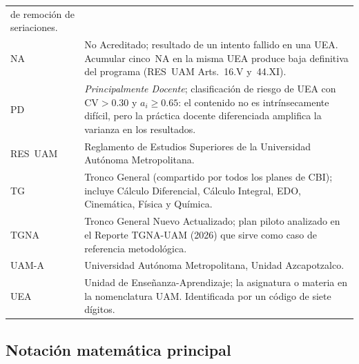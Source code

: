 \documentclass[11pt,letterpaper]{article}
\begin{document}
\begin{tabularx}{\linewidth}{@{}lX@{}}
          de remoción de seriaciones. \\[4pt]
NA      & No Acreditado; resultado de un intento fallido en una UEA.
          Acumular cinco~NA en la misma UEA produce baja definitiva
          del programa (RES~UAM Arts.~16.V y~44.XI). \\[4pt]
PD      & \emph{Principalmente Docente}; clasificación de riesgo de UEA con
          $\mathrm{CV}>0.30$ y $a_i\geq 0.65$: el contenido no es
          intrínsecamente difícil, pero la práctica docente diferenciada
          amplifica la varianza en los resultados. \\[4pt]
RES~UAM & Reglamento de Estudios Superiores de la Universidad Autónoma
          Metropolitana. \\[4pt]
TG      & Tronco General (compartido por todos los planes de CBI);
          incluye Cálculo Diferencial, Cálculo Integral, EDO,
          Cinemática, Física y Química. \\[4pt]
TGNA    & Tronco General Nuevo Actualizado; plan piloto analizado en el
          Reporte TGNA-UAM (2026) que sirve como caso de referencia
          metodológica. \\[4pt]
UAM-A   & Universidad Autónoma Metropolitana, Unidad Azcapotzalco. \\[4pt]
UEA     & Unidad de Enseñanza-Aprendizaje; la asignatura o materia en la
          nomenclatura UAM.  Identificada por un código de siete dígitos. \\
\bottomrule
\end{tabularx}

\bigskip
\subsection{Notación matemática principal}
\end{document}
